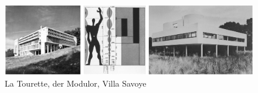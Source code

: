 \documentclass[a4paper]{tufte-handout}
\begin{document}
\begin{figure}[h]
  \includegraphics[width=\linewidth]{slideshow}%
  \caption{La Tourette, der Modulor, Villa Savoye}%
  \label{fig:fullfig}%
\end{figure}



%
%


\nocite{*}


\end{document}
